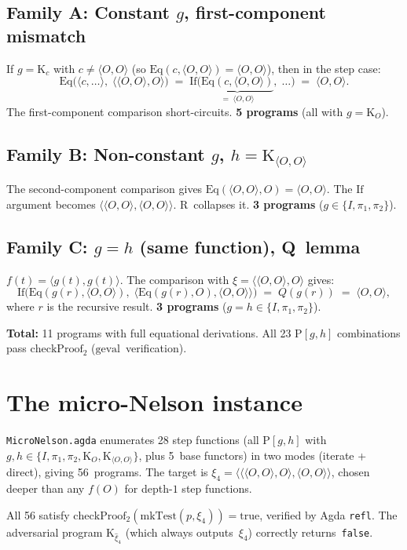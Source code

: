 \documentclass[11pt]{article}
\newcommand{\pair}[2]{\langle #1, #2 \rangle}
\newcommand{\pmark}{\pair{O}{O}}   %
\newcommand{\geval}{\mathrm{geval}}
\begin{document}
\subsection*{Family A: Constant $g$, first-component mismatch}
If $g = \mathrm{K}_c$ with $c \ne \pmark$
(so $\mathrm{Eq}(c, \pmark) = \pmark$),
then in the step case:
\[
  \mathrm{Eq}\bigl(\pair{c}{\ldots},\; \pair{\pmark}{O}\bigr)
  \;=\; \mathrm{If}\!\bigl(\underbrace{\mathrm{Eq}(c, \pmark)}_{=\;\pmark},\;
    \ldots\bigr)
  \;=\; \pmark.
\]
The first-component comparison short-circuits.
\textbf{5 programs} (all with $g = \mathrm{K}_O$).

\subsection*{Family B: Non-constant $g$, $h = \mathrm{K}_{\pmark}$}
The second-component comparison gives
$\mathrm{Eq}(\pmark, O) = \pmark$.
The $\mathrm{If}$ argument becomes $\pair{\pmark}{\pmark}$.
R~collapses it.
\textbf{3 programs} ($g \in \{I, \pi_1, \pi_2\}$).

\subsection*{Family C: $g = h$ (same function), Q~lemma}
$f(t) = \pair{g(t)}{g(t)}$.  The comparison with
$\xi = \pair{\pmark}{O}$ gives:
\[
  \mathrm{If}\!\bigl(\mathrm{Eq}(g(r), \pmark),\;
    \pair{\mathrm{Eq}(g(r), O)}{\pmark}\bigr)
  \;=\; Q(g(r)) \;=\; \pmark,
\]
where $r$ is the recursive result.
\textbf{3 programs} ($g = h \in \{I, \pi_1, \pi_2\}$).

\medskip\noindent
\textbf{Total:} 11 programs with full equational derivations.
All 23 $\mathrm{P}[g,h]$ combinations pass
$\mathrm{checkProof}_2$ ($\geval$~verification).

\section{The micro-Nelson instance}

\texttt{MicroNelson.agda} enumerates 28 step functions
(all $\mathrm{P}[g,h]$ with
$g, h \in \{I, \pi_1, \pi_2, \mathrm{K}_O, \mathrm{K}_{\pmark}\}$,
plus 5~base functors) in two modes (iterate + direct), giving
56~programs.  The target is
$\xi_4 = \pair{\pair{\pair{O}{O}}{O}}{\pair{O}{O}}$,
chosen deeper than any $f(O)$ for depth-$1$ step functions.

All 56 satisfy
$\mathrm{checkProof}_2(\mathrm{mkTest}(p, \xi_4)) = \mathrm{true}$,
verified by Agda \texttt{refl}.
The adversarial program $\mathrm{K}_{\hat\xi_4}$
(which always outputs~$\xi_4$) correctly returns~\texttt{false}.
\end{document}
